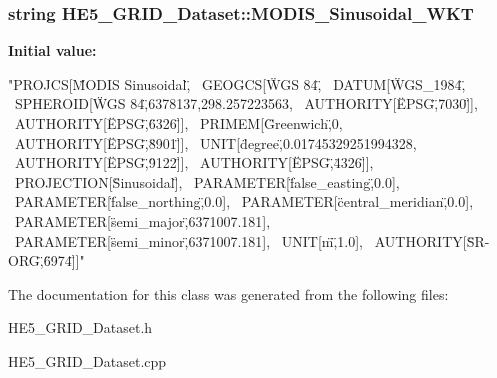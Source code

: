 \hypertarget{classHE5__GRID__Dataset_abdceb9a93b0892d8f64d0e8d97cd0d98}{
\subsubsection[{MODIS\_\-Sinusoidal\_\-WKT}]{\setlength{\rightskip}{0pt plus 5cm}string HE5\_\-GRID\_\-Dataset::MODIS\_\-Sinusoidal\_\-WKT}}
\label{classHE5__GRID__Dataset_abdceb9a93b0892d8f64d0e8d97cd0d98}
{\bfseries Initial value:}
\begin{DoxyCode}
"PROJCS[\"MODIS Sinusoidal\", \
    GEOGCS[\"WGS 84\", \
        DATUM[\"WGS_1984\", \
            SPHEROID[\"WGS 84\",6378137,298.257223563, \
                AUTHORITY[\"EPSG\",\"7030\"]], \
            AUTHORITY[\"EPSG\",\"6326\"]], \
        PRIMEM[\"Greenwich\",0, \
            AUTHORITY[\"EPSG\",\"8901\"]], \
        UNIT[\"degree\",0.01745329251994328, \
            AUTHORITY[\"EPSG\",\"9122\"]], \
        AUTHORITY[\"EPSG\",\"4326\"]], \
    PROJECTION[\"Sinusoidal\"], \
    PARAMETER[\"false_easting\",0.0], \
    PARAMETER[\"false_northing\",0.0], \
    PARAMETER[\"central_meridian\",0.0], \
    PARAMETER[\"semi_major\",6371007.181], \
    PARAMETER[\"semi_minor\",6371007.181], \
    UNIT[\"m\",1.0], \
    AUTHORITY[\"SR-ORG\",\"6974\"]]"
\end{DoxyCode}


The documentation for this class was generated from the following files:\begin{DoxyCompactItemize}
\item 
HE5\_\-GRID\_\-Dataset.h\item 
HE5\_\-GRID\_\-Dataset.cpp\end{DoxyCompactItemize}
